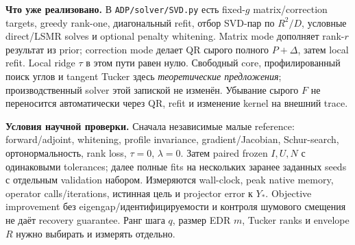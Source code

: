 \documentclass[11pt,a4paper]{article}
\begin{document}
\textbf{Что уже реализовано.} В \texttt{ADP/solver/SVD.py} есть
fixed-$g$ matrix/correction targets, greedy rank-one, диагональный refit,
отбор SVD-пар по $R^2/D$, условные direct/LSMR solves и optional penalty
whitening. Matrix mode дополняет rank-$r$ результат из prior;
correction mode делает QR сырого полного $P+\Delta$, затем local refit.
Local ridge $\tau$ в этом пути равен нулю.
Свободный core, профилированный поиск углов и tangent Tucker здесь
\emph{теоретические предложения}; производственный solver этой запиской
не изменён. Убывание сырого $F$ не переносится автоматически через QR,
refit и изменение kernel на внешний trace.

\textbf{Условия научной проверки.} Сначала независимые малые reference:
forward/adjoint, whitening, profile invariance, gradient/Jacobian,
Schur-search, ортонормальность, rank loss, $\tau=0$, $\lambda=0$.
Затем paired frozen $I,U,N$ с одинаковыми tolerances; далее полные fits
на нескольких заранее заданных seeds с отдельным validation набором.
Измеряются wall-clock, peak native memory, operator calls/iterations,
истинная цель и projector error к $Y_*$. Objective improvement без
eigengap/идентифицируемости и контроля шумового смещения не даёт recovery
guarantee. Ранг шага $q$, размер EDR $m$, Tucker ranks и envelope $R$
нужно выбирать и измерять отдельно.

\appendix
\end{document}
